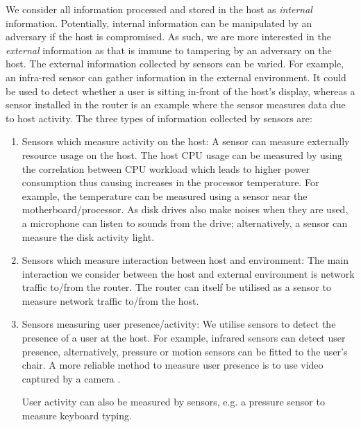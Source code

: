 We consider all information processed and stored in the host as {\em
internal} information.
Potentially, internal information
can be manipulated by an adversary if the host is
compromised.
As such, we are more interested in the {\em external} information
as that is immune to tampering by an adversary on the host.
The external information collected by sensors can be varied.
For example, an infra-red sensor can gather information in the
external environment. It could be used to detect whether
a user is sitting in-front of the host's display,
whereas a sensor installed in the router is an example where the sensor
measures data due to host activity.
The three types of information collected by sensors are:
\begin{enumerate}
\item Sensors which measure activity on the host:
A sensor can measure externally resource usage on the host.
The host CPU usage can be measured by using the correlation between
CPU workload which leads to higher power consumption thus causing
increases in the processor temperature.
For example, the temperature can be
measured using a sensor near the motherboard/processor.
As disk drives also make noises when they are used,
a microphone can listen to sounds from the drive; alternatively,
a sensor can measure the disk activity light.

\item Sensors which measure interaction between host and environment:
The main interaction we consider between the host and external environment
is network traffic to/from the router.
The router can itself be utilised as a sensor to measure network traffic
to/from the host.

\item Sensors measuring user presence/activity:
We utilise sensors to detect the presence of a user at the host.
For example, infrared sensors can detect user presence,
alternatively, pressure or motion sensors can be fitted to the user's chair.
A more reliable method to measure user presence is to use
video captured by a camera \cite{kumar2005using,kwang2009usability}.

User activity can also be measured by sensors, e.g.
a pressure sensor to measure keyboard typing.
\end{enumerate}

